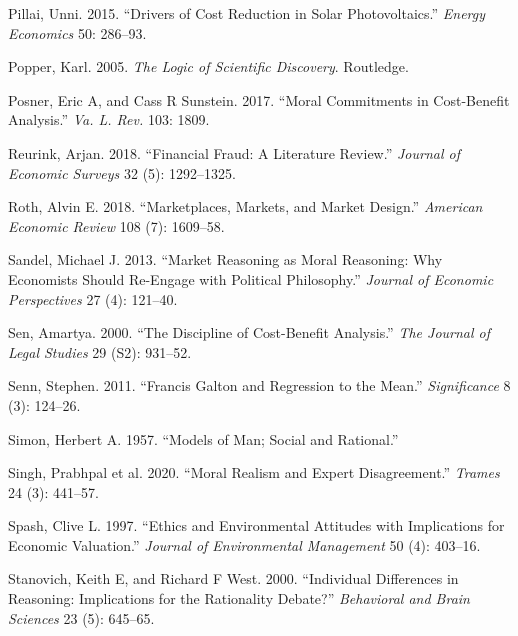 \documentclass[
]{book}
\newlength{\cslhangindent}
\newlength{\cslentryspacingunit} %
\newenvironment{CSLReferences}[2] %
 {%
  \setlength{\parindent}{0pt}
  \ifodd #1
  \let\oldpar\par
  \def\par{\hangindent=\cslhangindent\oldpar}
  \fi
  \setlength{\parskip}{#2\cslentryspacingunit}
 }%
 {}
\begin{document}
\begin{CSLReferences}{1}{0}
\leavevmode{}%
Pillai, Unni. 2015. {``Drivers of Cost Reduction in Solar Photovoltaics.''} \emph{Energy Economics} 50: 286--93.

\leavevmode{}%
Popper, Karl. 2005. \emph{The Logic of Scientific Discovery}. Routledge.

\leavevmode{}%
Posner, Eric A, and Cass R Sunstein. 2017. {``Moral Commitments in Cost-Benefit Analysis.''} \emph{Va. L. Rev.} 103: 1809.

\leavevmode{}%
Reurink, Arjan. 2018. {``Financial Fraud: A Literature Review.''} \emph{Journal of Economic Surveys} 32 (5): 1292--1325.

\leavevmode{}%
Roth, Alvin E. 2018. {``Marketplaces, Markets, and Market Design.''} \emph{American Economic Review} 108 (7): 1609--58.

\leavevmode{}%
Sandel, Michael J. 2013. {``Market Reasoning as Moral Reasoning: Why Economists Should Re-Engage with Political Philosophy.''} \emph{Journal of Economic Perspectives} 27 (4): 121--40.

\leavevmode{}%
Sen, Amartya. 2000. {``The Discipline of Cost-Benefit Analysis.''} \emph{The Journal of Legal Studies} 29 (S2): 931--52.

\leavevmode{}%
Senn, Stephen. 2011. {``Francis Galton and Regression to the Mean.''} \emph{Significance} 8 (3): 124--26.

\leavevmode{}%
Simon, Herbert A. 1957. {``Models of Man; Social and Rational.''}

\leavevmode{}%
Singh, Prabhpal et al. 2020. {``Moral Realism and Expert Disagreement.''} \emph{Trames} 24 (3): 441--57.

\leavevmode{}%
Spash, Clive L. 1997. {``Ethics and Environmental Attitudes with Implications for Economic Valuation.''} \emph{Journal of Environmental Management} 50 (4): 403--16.

\leavevmode{}%
Stanovich, Keith E, and Richard F West. 2000. {``Individual Differences in Reasoning: Implications for the Rationality Debate?''} \emph{Behavioral and Brain Sciences} 23 (5): 645--65.


\end{CSLReferences}
\end{document}
